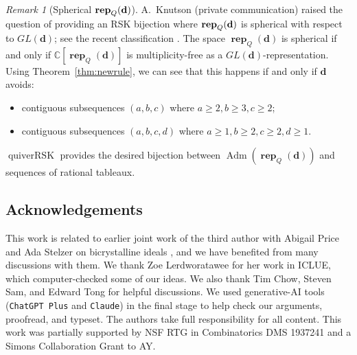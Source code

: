 \documentclass[12pt]{amsart}
\renewcommand{\d}{\mathbf{d}}
\DeclareMathOperator{\rep}{\mathbf{rep}}
\DeclareMathOperator{\Std}{\operatorname{Adm}}
\theoremstyle{definition}
\theoremstyle{remark}
\newtheorem{remark}[theorem]{Remark}
\begin{document}
\begin{remark}[Spherical $\rep_Q({\bf d})$]
A.~Knutson (private communication) raised the question of providing an RSK bijection where $\rep_Q({\bf d})$ is spherical with respect
to $GL(\d)$; see the recent classification \cite{MullerReineke}. 
The space $\rep_Q(\mathbf d)$ is spherical if and only if
$\mathbb C[\rep_Q(\mathbf d)]$ is multiplicity-free as a $GL(\mathbf d)$-representation. Using Theorem~\ref{thm:newrule}, we can see that this happens if and only if $\d$ avoids:
\begin{itemize}
\item contiguous subsequences $(a,b,c)$ where $a\geq 2, b\geq 3, c\geq 2$;
\item contiguous subsequences $(a,b,c,d)$ where $a\geq 1, b\geq 2, c\geq 2, d\geq 1$.
\end{itemize}
$\operatorname{quiverRSK}$ provides the desired bijection
between $\Std(\rep_Q(\d))$ and sequences of rational tableaux.
\end{remark}

%

\subsection*{Acknowledgements}
This work is related to earlier joint work of the third author with Abigail Price and Ada Stelzer on bicrystalline ideals \cite{AAA,AAA2}, and we have benefited from many discussions with them. 
We thank Zoe Lerdworatawee for her work in ICLUE, which computer-checked some of our ideas. We also thank Tim Chow, Steven Sam, and Edward Tong for helpful discussions. 
We used generative-AI tools ({\tt ChatGPT Plus} and {\tt Claude}) in the final stage to help 
check our arguments, proofread, and typeset.  The authors take full responsibility for all content.
This work was partially supported by NSF RTG in Combinatorics DMS 1937241 and a Simons Collaboration Grant to AY.




\end{document}
